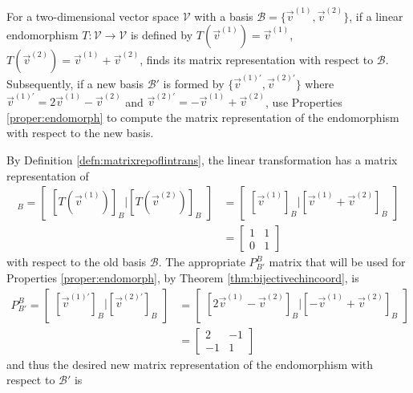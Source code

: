 \begin{exmp}
\label{exmp:endomorphch}
For a two-dimensional vector space $\mathcal{V}$ with a basis $\mathcal{B} = \{\vec{v}^{(1)}, \vec{v}^{(2)}\}$, if a linear endomorphism $T: \mathcal{V} \to \mathcal{V}$ is defined by $T(\vec{v}^{(1)}) = \vec{v}^{(1)}$, $T(\vec{v}^{(2)}) = \vec{v}^{(1)} + \vec{v}^{(2)}$, finds its matrix representation with respect to $\mathcal{B}$. Subsequently, if a new basis $\mathcal{B}'$ is formed by $\{\vec{v}^{(1)'}, \vec{v}^{(2)'}\}$ where $\vec{v}^{(1)'} = 2\vec{v}^{(1)} - \vec{v}^{(2)}$ and $\vec{v}^{(2)'} = -\vec{v}^{(1)} + \vec{v}^{(2)}$, use Properties \ref{proper:endomorph} to compute the matrix representation of the endomorphism with respect to the new basis.
\end{exmp}
\begin{solution}
By Definition \ref{defn:matrixrepoflintrans}, the linear transformation has a matrix representation of
\begin{align*}
[T]_B = \begin{bmatrix}
[T(\vec{v}^{(1)})]_B|[T(\vec{v}^{(2)})]_B    
\end{bmatrix} &= 
\begin{bmatrix}
[\vec{v}^{(1)}]_B|[\vec{v}^{(1)} + \vec{v}^{(2)}]_B    
\end{bmatrix} \\
&=
\begin{bmatrix}
1 & 1 \\
0 & 1
\end{bmatrix}
\end{align*}
with respect to the old basis $\mathcal{B}$. The appropriate $P_{B'}^B$ matrix that will be used for Properties \ref{proper:endomorph}, by Theorem \ref{thm:bijectivechincoord}, is
\begin{align*}
P_{B'}^B = 
\begin{bmatrix}
[\vec{v}^{(1)'}]_B|[\vec{v}^{(2)'}]_B
\end{bmatrix}
&= \begin{bmatrix}
[2\vec{v}^{(1)} - \vec{v}^{(2)}]_B|[-\vec{v}^{(1)} + \vec{v}^{(2)}]_B
\end{bmatrix} \\
&=
\begin{bmatrix}
2 & -1 \\
-1 & 1
\end{bmatrix}
\end{align*}
and thus the desired new matrix representation of the endomorphism with respect to $\mathcal{B}'$ is
\begin{align*}

\end{align*}
\end{solution}
